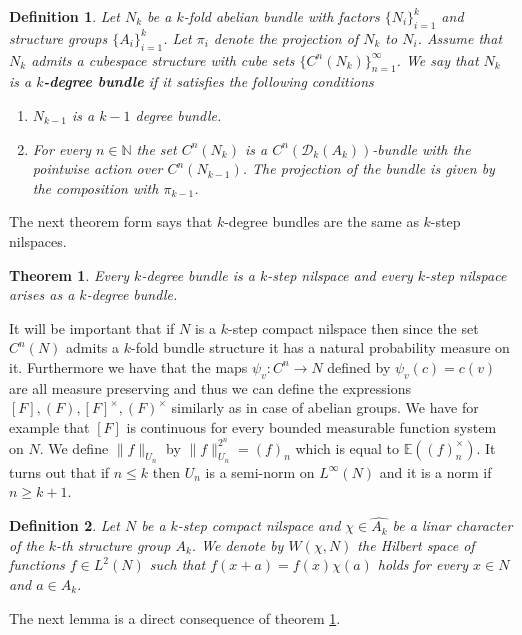 \documentclass [11pt] {article}
\newtheorem{theorem}{Theorem}
\newtheorem{definition}{Definition}[section]
\begin{document}
\begin{definition} Let $N_k$ be a $k$-fold abelian bundle with factors $\{N_i\}_{i=1}^k$ and structure groups $\{A_i\}_{i=1}^k$. Let $\pi_i$ denote the projection of $N_k$ to $N_i$.
Assume that $N_k$ admits a cubespace structure with cube sets $\{C^n(N_k)\}_{n=1}^\infty$.
We say that $N_k$ is a {\bf $k$-degree bundle} if it satisfies the following conditions
\begin{enumerate}
\item $N_{k-1}$ is a $k-1$ degree bundle.
\item For every $n\in\mathbb{N}$ the set $C^n(N_k)$ is a $C^n(\mathcal{D}_k(A_k))$-bundle with the pointwise action over $C^n(N_{k-1})$. The projection of the bundle is given by the composition with $\pi_{k-1}$.
\end{enumerate} 
\end{definition}

The next theorem form \cite{NP} says that $k$-degree bundles are the same as $k$-step nilspaces.

\begin{theorem}\label{bundec} Every $k$-degree bundle is a $k$-step nilspace and every $k$-step nilspace arises as a $k$-degree bundle. 
\end{theorem}

It will be important that if $N$ is a $k$-step compact nilspace then since the set $C^n(N)$ admits a $k$-fold bundle structure it has a natural probability measure on it.
Furthermore we have that the maps $\psi_v:C^n\rightarrow N$ defined by $\psi_v(c)=c(v)$ are all measure preserving and thus we can define the expressions $[F],(F),[F]^\times,(F)^\times$ similarly as in case of abelian groups.
We have for example that $[F]$ is continuous for every bounded measurable function system on $N$. 
We define $\|f\|_{U_n}$ by $\|f\|_{U_n}^{2^n}=(f)_n$ which is equal to $\mathbb{E}((f)_n^\times)$.
It turns out that if $n\leq k$ then $U_n$ is a semi-norm on $L^\infty(N)$ and it is a norm if $n\geq k+1$.

\begin{definition} Let $N$ be a $k$-step compact nilspace and $\chi\in\hat{A_k}$ be a linar character of the $k$-th structure group $A_k$. We denote by $W(\chi,N)$ the Hilbert space of functions $f\in L^2(N)$ such that $f(x+a)=f(x)\chi(a)$ holds for every $x\in N$ and $a\in A_k$.
\end{definition}

The next lemma is a direct consequence of theorem \ref{bundec}.
\end{document}
